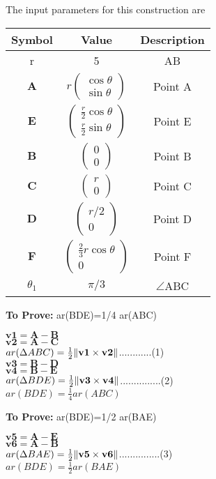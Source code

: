 \documentclass[10pt, a4paper]{article}
\newcommand{\myvec}[1]{\ensuremath{\begin{pmatrix}#1\end{pmatrix}}}
\let\vec\mathbf
\begin{document}
The input parameters for this construction are 
\begin{center}
\begin{tabular}{|c|c|c|}
 \hline
 \textbf{Symbol}&\textbf{Value}&\textbf{Description}\\
 \hline
 r&5&AB\\
 \hline

 $\vec{A}$&$r\myvec{\cos\theta \\ \sin\theta}$%
 &Point A\\
 \hline
 $\vec{E}$&$\myvec{\frac{r}{2}\cos\theta \\ \frac{r}{2}\sin\theta}$
 &Point E\\
 \hline
 $\vec{B}$&$\myvec{0 \\ 0}$%
 &Point B\\
 \hline
 $\vec{C}$&$\myvec{r \\ 0}$%
 &Point C\\
 \hline
 $\vec{D}$&$\myvec{r/2 \\ 0}$%
 &Point D\\
 \hline
 $\vec{F}$&$\myvec{\frac{2}{3}r\cos\theta \\ 0}$%
 &Point F\\
 \hline
 ${\theta}_1$& $\pi/3$&$ \angle $ABC\\ 
 \hline
\end{tabular}
\end{center}
\textbf{To Prove:} ar(BDE)=1/4 ar(ABC)
  \begin{center}
 
 $\vec{v1}=\vec{A-B}$\\
 $\vec{v2}=\vec{A-C}$\\

$ar(\Delta ABC) =\frac{1}{2}\norm{\vec{v1}\times\vec{v2}}$............(1)\\
$\vec{v3}=\vec{B-D}$\\
 $\vec{v4}=\vec{B-E}$\\
 
 $ar(\Delta BDE) =\frac{1}{2}\norm{\vec{v3}\times\vec{v4}}$...............(2)\\
 $ar(BDE)= \frac{1}{4} ar(ABC)$
 \end{center}
 \textbf{To Prove:}  ar(BDE)=1/2 ar(BAE) 
 \begin{center}
$\vec{v5}=\vec{A-E}$\\
$\vec{v6}=\vec{A-B}$\\

 $ar(\Delta BAE) =\frac{1}{2}\norm{\vec{v5}\times\vec{v6}}$...............(3)\\
 $ar(BDE)=\frac{1}{2} ar(BAE)$
\end{center}
\end{document}
